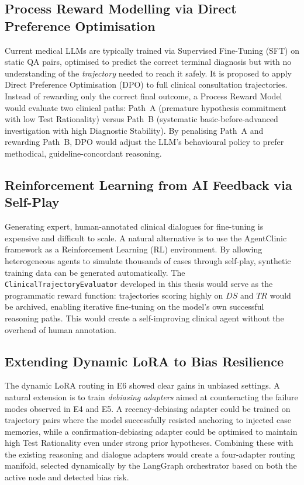 \subsection{Process Reward Modelling via Direct Preference Optimisation}

Current medical LLMs are typically trained via Supervised Fine-Tuning (SFT) on static QA pairs, optimised to predict the correct terminal diagnosis but with no understanding of the \textit{trajectory} needed to reach it safely. It is proposed to apply Direct Preference Optimisation (DPO) to full clinical consultation trajectories. Instead of rewarding only the correct final outcome, a Process Reward Model would evaluate two clinical paths: Path~A (premature hypothesis commitment with low Test Rationality) versus Path~B (systematic basic-before-advanced investigation with high Diagnostic Stability). By penalising Path~A and rewarding Path~B, DPO would adjust the LLM's behavioural policy to prefer methodical, guideline-concordant reasoning.

\subsection{Reinforcement Learning from AI Feedback via Self-Play}

Generating expert, human-annotated clinical dialogues for fine-tuning is expensive and difficult to scale. A natural alternative is to use the AgentClinic framework as a Reinforcement Learning (RL) environment. By allowing heterogeneous agents to simulate thousands of cases through self-play, synthetic training data can be generated automatically. The \texttt{ClinicalTrajectoryEvaluator} developed in this thesis would serve as the programmatic reward function: trajectories scoring highly on $DS$ and $TR$ would be archived, enabling iterative fine-tuning on the model's own successful reasoning paths. This would create a self-improving clinical agent without the overhead of human annotation.

\subsection{Extending Dynamic LoRA to Bias Resilience}

The dynamic LoRA routing in E6 showed clear gains in unbiased settings. A natural extension is to train \textit{debiasing adapters} aimed at counteracting the failure modes observed in E4 and E5. A recency-debiasing adapter could be trained on trajectory pairs where the model successfully resisted anchoring to injected case memories, while a confirmation-debiasing adapter could be optimised to maintain high Test Rationality even under strong prior hypotheses. Combining these with the existing reasoning and dialogue adapters would create a four-adapter routing manifold, selected dynamically by the LangGraph orchestrator based on both the active node and detected bias risk.

